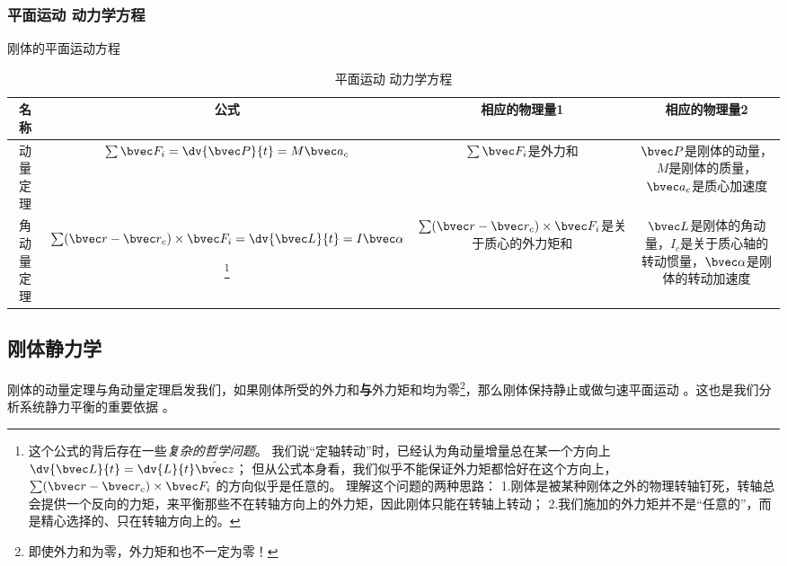 \subsubsection{平面运动 动力学方程}
刚体的平面运动方程
\begin{table}[ht]
\centering
\caption{平面运动 动力学方程}\label{tab_RGAB_1}
\begin{tabular}{|c|c|c|c|}
\hline
名称 & 公式 & 相应的物理量1 & 相应的物理量2 \\
\hline
动量定理 & $\sum \bvec F_i = \dv{\bvec P}{t} = M \bvec a_c$ & $\sum \bvec F_i$是外力和 & $\bvec P$是刚体的动量，$M$是刚体的质量，$\bvec a_c$是质心加速度 \\
\hline
角动量定理 & $\sum (\bvec r - \bvec r_c) \times \bvec F_i = \dv{\bvec L}{t} = I \bvec \alpha$ 

\footnote{
这个公式的背后存在一些\textsl{复杂的哲学问题}。
我们说“定轴转动”时，已经认为角动量增量总在某一个方向上$\dv{\bvec L}{t} = \dv{L}{t} \hat{\bvec z}$；
但从公式本身看，我们似乎不能保证外力矩都恰好在这个方向上，$\sum (\bvec r - \bvec r_c) \times \bvec F_i$ 的方向似乎是任意的。
理解这个问题的两种思路：
1.刚体是被某种刚体之外的物理转轴钉死，转轴总会提供一个反向的力矩，来平衡那些不在转轴方向上的外力矩，因此刚体只能在转轴上转动；
2.我们施加的外力矩并不是“任意的”，而是精心选择的、只在转轴方向上的。
} 

& $\sum (\bvec r - \bvec r_c)\times \bvec F_i$是关于质心的外力矩和 & $\bvec L$是刚体的角动量，$I_c$是关于质心轴的转动惯量，$\bvec \alpha$是刚体的转动加速度 \\
\hline
\end{tabular}
\end{table}

\subsection{刚体静力学}
刚体的动量定理与角动量定理启发我们，如果刚体所受的外力和\textbf{与}外力矩和均为零\footnote{即使外力和为零，外力矩和也不一定为零！}，那么刚体保持静止或做匀速平面运动 。这也是我们分析系统静力平衡的重要依据 。


